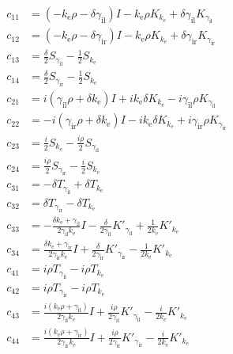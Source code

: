 \begin{align*}
  c_{11} &= (-k_\text{e} \rho-\delta \gamma_\text{il}) I-k_\text{e}\rho K_{k_\text{e}} + \delta \gamma_\text{il} K_{\gamma_\text{il}} \\
  c_{12} &= (-k_\text{e} \rho-\delta \gamma_\text{ir}) I-k_\text{e}\rho K_{k_\text{e}} + \delta \gamma_\text{ir} K_{\gamma_\text{ir}} \\
  c_{13} &= \frac{\delta}{2}S_{\gamma_\text{il}} - \frac{1}{2} S_{k_\text{e}} \\
  c_{14} &= \frac{\delta}{2}S_{\gamma_\text{ir}} - \frac{1}{2} S_{k_\text{e}} \\
  c_{21} &= i (\gamma_\text{il} \rho+\delta k_\text{e}) I+ i k_\text{e} \delta K_{k_\text{e}} - i\gamma_\text{il}\rho K_{\gamma_\text{il}} \\
  c_{22} &= -i (\gamma_\text{ir} \rho+\delta k_\text{e}) I- i k_\text{e} \delta K_{k_\text{e}} + i \gamma_\text{ir}\rho K_{\gamma_\text{ir}} \\
  c_{23} &= \frac{i}{2} S_{k_\text{e}} - \frac{i\rho}{2} S_{\gamma_\text{il}} \\
  c_{24} &= \frac{i\rho}{2} S_{\gamma_\text{ir}} - \frac{i}{2} S_{k_\text{e}} \\
  c_{31} &= -\delta T_{\gamma_\text{il}} + \delta T_{k_\text{e}} \\
  c_{32} &= \delta T_{\gamma_\text{ir}} - \delta T_{k_\text{e}} \\
  c_{33} &= -\frac{\delta k_\text{e}+\gamma_\text{il}}{2 \gamma_\text{il} k_\text{e}}I- \frac{\delta}{2 \gamma_\text{il}} K'_{\gamma_\text{il}} + \frac{1}{2 k_\text{e}} K'_{k_\text{e}} \\
  c_{34} &= \frac{\delta k_\text{e}+\gamma_\text{ir}}{2 \gamma_\text{ir} k_\text{e}} I + \frac{\delta}{2 \gamma_\text{ir}} K'_{\gamma_\text{ir}} - \frac{1}{2 k_\text{e}} K'_{k_\text{e}} \\
  c_{41} &= i \rho T_{\gamma_\text{il}} - i \rho T_{k_\text{e}} \\
  c_{42} &= i \rho T_{\gamma_\text{ir}} - i \rho T_{k_\text{e}} \\
  c_{43} &= \frac{i(k_\text{e} \rho + \gamma_\text{il})}{2 \gamma_\text{il} k_\text{e}} I +\frac{i\rho}{2 \gamma_\text{il}}K'_{\gamma_\text{il}} - \frac{i}{2 k_\text{e}} K'_{k_\text{e}} \\
  c_{44} &= \frac{i(k_\text{e} \rho+ \gamma_\text{ir})}{2 \gamma_\text{ir} k_\text{e}} I + \frac{i\rho}{2 \gamma_\text{ir}} K'_{\gamma_\text{ir}} - \frac{i}{2k_\text{e}}K'_{k_\text{e}}
\end{align*}
